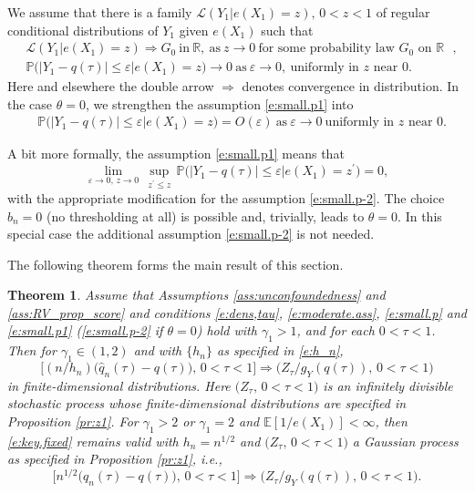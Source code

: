 \documentclass[12pt]{amsart}
\newcommand{\vep}{\varepsilon}
\newcommand{\bbr}{\mathbb{R}}
\newcommand{\1}{\mathbbm{1}}
\newcommand{\0}{\mathbf{0}}
\newcommand{\E}{\mathbb{E}}
\theoremstyle{plain}
\newtheorem{theorem}{Theorem}[section]
\theoremstyle{definition}
\newcommand{\bbP}{\mathbb{P}}
\begin{document}
We assume that there is a family 
${\mathcal L}(Y_1|e(X_1)=z), \, 0<z<1$
of regular conditional distributions of $Y_1$ given $e(X_1)$ such that
%
\begin{align} \label{e:small.p}
  &{\mathcal L}(Y_1|e(X_1)=z) \Rightarrow G_0 \ \text{in} \ \bbr, \ \text{as}
  \ z\to 0 \ \text{for some probability law $G_0$ on $\bbr$ }, \\
  \label{e:small.p1}
&\bbP \bigl( |Y_1- q(\tau)|\leq \vep \big| e(X_1)=z\bigr) \to 0 \
\text{as} \ \vep\to 0, \ \text{uniformly in $z$ near 0.}
\end{align}
%
 Here and elsewhere the double arrow $\Rightarrow$ denotes convergence in distribution. In the case $\theta=0$, we strengthen the assumption \eqref{e:small.p1} into 
\begin{align} \label{e:small.p-2}
  &\bbP \bigl( |Y_1- q(\tau)|\leq \vep \big| e(X_1)=z\bigr)=O(\varepsilon)
\ \text{as} \ \vep\to 0 \ \text{uniformly in $z$ near 0.}
\end{align}

A bit more formally, the   assumption \eqref{e:small.p1} 
means that
$$
\lim_{\vep\to 0, \, z\to 0} \, \sup_{z^\prime\leq z}\,
\bbP \bigl( |Y_1- q(\tau)|\leq \vep \big| e(X_1)=z^\prime\bigr) =0,
$$
with the appropriate modification for the assumption 
\eqref{e:small.p-2}.  The choice $b_n=0$ (no thresholding at all) is possible and, trivially, leads to $\theta=0$. In this special case the additional assumption  \eqref{e:small.p-2} is not needed.
 

 
The following theorem forms the main result of this section. 
 
 \begin{theorem} \label{th:Z1} Assume that  Assumptions \ref{ass:unconfoundedness} and \ref{ass:RV_prop_score} and conditions  
 \eqref{e:dens,tau}, \eqref{e:moderate.ass}, \eqref{e:small.p}
 and 
 \eqref{e:small.p1} (\eqref{e:small.p-2} if $\theta=0$) hold with $\gamma_1>1$, and for each $0<\tau<1$. Then for $\gamma_1\in (1,2)$ and with $\{h_n\}$ as specified in \eqref{e:h_n},  
%
\begin{equation} \label{e:key.fixed}
   \bigl[ (n/h_n)\bigl( \hat q_n(\tau) -q(\tau)\bigr), \,
   0<\tau<1\bigr] \Rightarrow \bigl( Z_\tau/g_Y(q(\tau)), \, 0<\tau<1\bigr)
   \end{equation}
   in finite-dimensional distributions. Here 
$\bigl(
   Z_\tau, \, 0<\tau<1\bigr)$ is an infinitely divisible
   stochastic process whose finite-dimensional distributions are
   specified in Proposition \ref{pr:z1}.   For $\gamma_1>2$ or $\gamma_1=2$ and $\E [1/e(X_1)]<\infty$, then \eqref{e:key.fixed} remains valid with $h_n=n^{1/2}$ and $\bigl(
   Z_\tau, \, 0<\tau<1\bigr)$  a Gaussian process as specified in Proposition \ref{pr:z1}, i.e.,
   \begin{equation*} \label{e:key.fixed2}
   \bigl[ n^{1/2}\bigl( \hat q_n(\tau) -q(\tau)\bigr), \,
   0<\tau<1\bigr] \Rightarrow \bigl( Z_\tau/g_Y(q(\tau)), \, 0<\tau<1\bigr).
   \end{equation*}
   
   \end{theorem}
\end{document}

